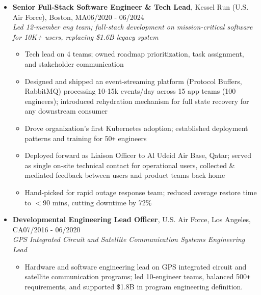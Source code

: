 \documentclass[10pt]{extarticle}
\begin{document}
\begin{itemize}
    \item \textbf{Senior Full-Stack Software Engineer \& Tech Lead}, Kessel Run (U.S. Air Force), Boston, MA\hfill 06/2020 - 06/2024 \\ \emph{Led 12-member eng team; full-stack development on mission-critical software for 10K+ users, replacing \$1.6B legacy system}
    \begin{itemize}
        \itemsep0em
        \item Tech lead on 4 teams; owned roadmap prioritization, task assignment, and stakeholder communication
        \item Designed and shipped an event-streaming platform (Protocol Buffers, RabbitMQ) processing 10-15k events/day across 15 app teams (100 engineers); introduced rehydration mechanism for full state recovery for any downstream consumer
        \item Drove organization's first Kubernetes adoption; established deployment patterns and training for 50\verb!+! engineers
        \item Deployed forward as Liaison Officer to Al Udeid Air Base, Qatar; served as single on-site technical contact for operational users, collected \& mediated feedback between users and product teams back home 
        \item Hand-picked for rapid outage response team; reduced average restore time to $<$90 mins, cutting downtime by 72\%
    \end{itemize}
    
    \item \textbf{Developmental Engineering Lead Officer}, U.S. Air Force, Los Angeles, CA\hfill 07/2016 - 06/2020 \\ \emph{GPS Integrated Circuit and Satellite Communication Systems Engineering Lead}
    \begin{itemize}
        \itemsep0em
        \item Hardware and software engineering lead on GPS integrated circuit and satellite communication programs; led 10-engineer teams, balanced 500\verb!+! requirements, and supported \$1.8B in program engineering definition.
    \end{itemize}
    
    \end{itemize} 

\end{document}
